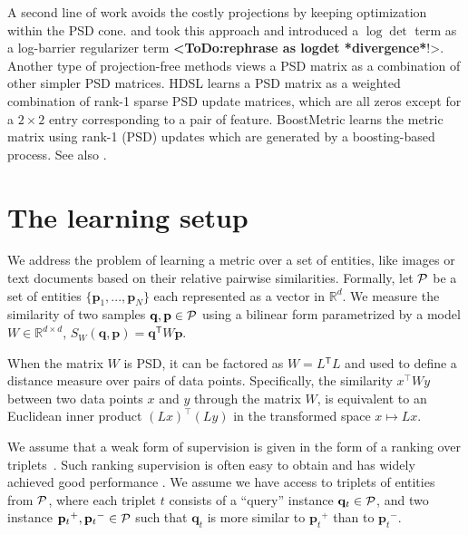\documentclass[twoside,11pt]{article}
\newcommand\todo[1]{\textbf{<ToDo:#1}!>}
\newcommand\mat[1]{{#1}}
\renewcommand\vec[1]{\mathbf{#1}}
\newcommand{\T}{{}^\mathsf{T}}
\newcommand{\W}{\mat{W}}
\newcommand{\Rd}{\mathbb{R}^d}
\newcommand{\ignore}[1]{}
\newcommand{\q}{{\vec{q}}}
\newcommand{\p}{{\vec{p}}}
\newcommand{\trip}{{t}}
\newcommand{\qt}{{\q_{\trip}}}
\newcommand{\pt}{{\p_{\trip}}}
\newcommand{\cholL}{\mat{L}}
\begin{document}
A second line of work avoids the costly projections by keeping optimization within the PSD cone. \citet{davis2007information} and \citet{lego} took this approach and introduced a $\log \det$ term as a log-barrier regularizer term \todo{rephrase as logdet *divergence*}. Another type of projection-free methods views a PSD matrix as a combination of other simpler PSD matrices. HDSL \citep{HDSL} learns a PSD matrix as a weighted combination of rank-1 sparse PSD update matrices, which are all zeros except for a $2\times2$ entry corresponding to a pair of feature. BoostMetric \citep{boost} learns the metric matrix using rank-1 (PSD) updates which are generated by a boosting-based process. See also \citet{bi2011adaboost, liu2012robust}.

\ignore{
We take here an approach based on minimizing a strongly convex function using block-coordinate descent. There is a well established body of work analyzing the convergence of block-coordinate descent, e.g. \citep{nesterov2012efficiency,richtarik2014iteration}. We discuss this further in Section 5 below.
}

\section{The learning setup}
We address the problem of learning a metric over a set of
entities, like images or text documents based on their
relative pairwise similarities. Formally, let $\cal{P}$ be a set of entities $\{\p_1,...,\p_N\}$ each represented as a vector in $\Rd$. We measure the similarity of two samples $\q, \p \in \cal{P}$ using a bilinear form parametrized by a model $\W \in \mathbb{R}^{d \times d}$, $S_{\W}(\q, \p) = \q\T \W \p$.

When the matrix $\W$ is PSD, it can be factored as $\W = \cholL\T \cholL$ and used to define a distance measure over pairs of data points. Specifically, the similarity $x^\top\W y$ between two data points $x$ and $y$ through the matrix $\W$, is equivalent to an Euclidean inner product  $(\cholL x)^\top(\cholL y)$ in the transformed space $x \mapsto \cholL x$. 

We assume that a weak form of supervision is given in the form of a ranking over triplets~\citep{weinberger2006dml,OASIS,qian}. Such ranking supervision is often easy to obtain and has widely achieved good performance . We assume we have access to triplets of entities from $\cal{P}$, where each triplet $t$ consists of
a ``query'' instance $\qt \in \cal{P}$, and two instance $\pt^{+}, \pt^{-} \in \cal{P}$ such that $\qt$ is more similar to $\pt^{+}$
than to $\pt^{-}$.
\end{document}
